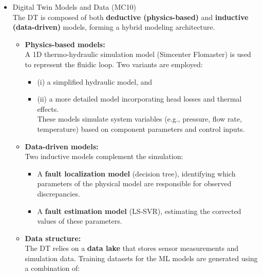 \documentclass[
]{article}
\providecommand{\tightlist}{%
  \setlength{\itemsep}{0pt}\setlength{\parskip}{0pt}}
\begin{document}
\begin{itemize}
\begin{itemize}
\begin{itemize}
      \begin{itemize}
      \item
        Digital Twin Models and Data (MC10)\\
        The DT is composed of both \textbf{deductive (physics-based)}
        and \textbf{inductive (data-driven)} models, forming a hybrid
        modeling architecture.

        \begin{itemize}
        \tightlist
        \item
          \textbf{Physics-based models:}\\
          A 1D thermo-hydraulic simulation model (Simcenter Flomaster)
          is used to represent the fluidic loop. Two variants are
          employed:

          \begin{itemize}
          \tightlist
          \item
            (i) a simplified hydraulic model, and
          \item
            (ii) a more detailed model incorporating head losses and
            thermal effects.\\
            These models simulate system variables (e.g., pressure, flow
            rate, temperature) based on component parameters and control
            inputs.
          \end{itemize}
        \item
          \textbf{Data-driven models:}\\
          Two inductive models complement the simulation:

          \begin{itemize}
          \tightlist
          \item
            A \textbf{fault localization model} (decision tree),
            identifying which parameters of the physical model are
            responsible for observed discrepancies.
          \item
            A \textbf{fault estimation model} (LS‑SVR), estimating the
            corrected values of these parameters.
          \end{itemize}
        \item
          \textbf{Data structure:}\\
          The DT relies on a \textbf{data lake} that stores sensor
          measurements and simulation data. Training datasets for the ML
          models are generated using a combination of:


\end{itemize}
\end{itemize}
\end{itemize}
\end{itemize}
\end{itemize}
\end{document}
